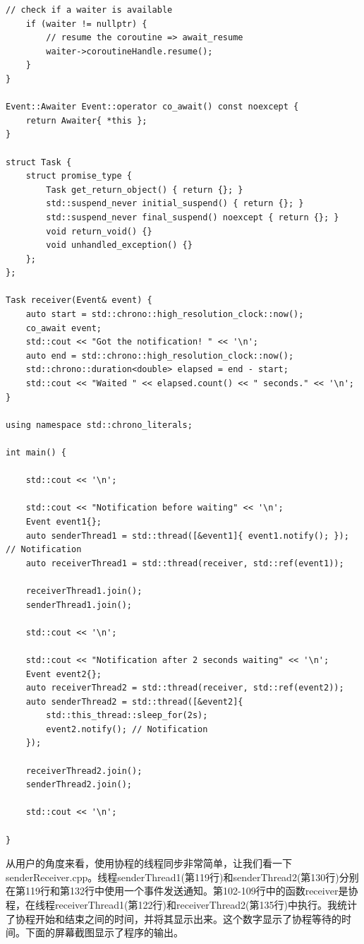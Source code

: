 \begin{lstlisting}[style=styleCXX]
	// check if a waiter is available
	if (waiter != nullptr) {
		// resume the coroutine => await_resume
		waiter->coroutineHandle.resume();
	}
}

Event::Awaiter Event::operator co_await() const noexcept {
	return Awaiter{ *this };
}

struct Task {
	struct promise_type {
		Task get_return_object() { return {}; }
		std::suspend_never initial_suspend() { return {}; }
		std::suspend_never final_suspend() noexcept { return {}; }
		void return_void() {}
		void unhandled_exception() {}
	};
};

Task receiver(Event& event) {
	auto start = std::chrono::high_resolution_clock::now();
	co_await event;
	std::cout << "Got the notification! " << '\n';
	auto end = std::chrono::high_resolution_clock::now();
	std::chrono::duration<double> elapsed = end - start;
	std::cout << "Waited " << elapsed.count() << " seconds." << '\n';
}

using namespace std::chrono_literals;

int main() {
	
	std::cout << '\n';
	
	std::cout << "Notification before waiting" << '\n';
	Event event1{};
	auto senderThread1 = std::thread([&event1]{ event1.notify(); }); // Notification
	auto receiverThread1 = std::thread(receiver, std::ref(event1));
	
	receiverThread1.join();
	senderThread1.join();
	
	std::cout << '\n';
	
	std::cout << "Notification after 2 seconds waiting" << '\n';
	Event event2{};
	auto receiverThread2 = std::thread(receiver, std::ref(event2));
	auto senderThread2 = std::thread([&event2]{
		std::this_thread::sleep_for(2s);
		event2.notify(); // Notification
	});
	
	receiverThread2.join();
	senderThread2.join();
	
	std::cout << '\n';
	
}
\end{lstlisting}

从用户的角度来看，使用协程的线程同步非常简单，让我们看一下senderReceiver.cpp。线程senderThread1(第119行)和senderThread2(第130行)分别在第119行和第132行中使用一个事件发送通知。第102-109行中的函数receiver是协程，在线程receiverThread1(第122行)和receiverThread2(第135行)中执行。我统计了协程开始和结束之间的时间，并将其显示出来。这个数字显示了协程等待的时间。下面的屏幕截图显示了程序的输出。

